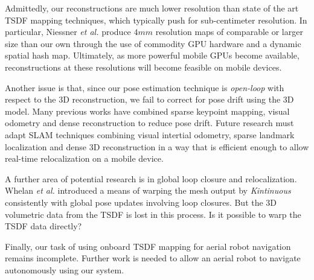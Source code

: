\documentclass[conference]{IEEEtran}
\newcommand{\etal}{\textit{et al. }}
\newcommand{\Tango}{\textit{Tango} }
\newif\iffinalcopy
\begin{document}
Admittedly, our reconstructions are much lower resolution than state of the art
TSDF mapping techniques, which typically push for sub-centimeter resolution. In
particular, Niessner \etal \cite{NiessnerHashing} produce $4mm$ resolution maps
of comparable or larger size than our own through the use of commodity GPU
hardware and a dynamic spatial hash map. Ultimately, as more powerful mobile
GPUs become available, reconstructions at these resolutions will become
feasible on mobile devices. 

Another issue is that, since our pose estimation technique is
\textit{open-loop} with respect to the 3D reconstruction, we fail to correct for
pose drift using the 3D model. Many previous works \cite{StuecklerSparseDense,
niessner2014combining} have combined sparse keypoint mapping, visual odometry
and dense reconstruction to reduce pose drift. Future research must adapt SLAM
techniques combining visual intertial odometry, sparse landmark localization
and dense 3D reconstruction in a way that is efficient enough to allow
real-time relocalization on a mobile device.

A further area of potential research is in global loop closure and
relocalization. Whelan \etal\cite{WhelanLoopClose} introduced a means of warping
the mesh output by \textit{Kintinuous} consistently with global pose updates
 involving loop closures. But the 3D volumetric data from the TSDF is lost in
 this process. Is it possible to warp the TSDF data directly?

Finally, our task of using onboard TSDF mapping for aerial robot navigation
remains incomplete. Further work is needed to allow an aerial robot to navigate
autonomously using our system.


\iffinalcopy
	\section*{Acknowledgements}
	This work was done as part of Google's Advanced Technologies and Projects
	division (ATAP) for \Tango. Thanks to Johnny Lee, Joel Hesch, Esha
	Nerurkar, and Simon Lynen and other ATAP members for their close collaboration
	and support on this project. Thanks to Ryan Hickman for collecting outdoor data.
\fi



 
\end{document}
